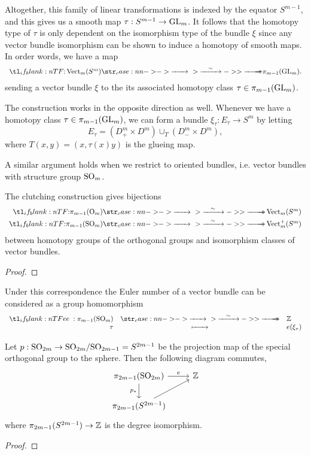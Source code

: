 Altogether, this family of linear transformations is indexed by the equator $S^{m-1}$, and this gives us a smooth map $\tau : S^{m-1}\to \mathrm{GL}_m$. It follows that the homotopy type of $\tau$ is only dependent on the isomorphism type of the bundle $\xi$ since any vector bundle isomorphism can be shown to induce a homotopy of smooth maps. In order words, we have a map
\[
	\lkxfunc{}{\Vect_m(S^m)}{\pi_{m-1}(\GL_m).}
\]
sending a vector bundle $\xi$ to the its associated homotopy class $\tau\in \pi_{m-1}(\mathrm{GL}_m)$.

The construction works in the opposite direction as well. Whenever we have a homotopy class $\tau\in \pi_{m-1}(\mathrm{GL}_m)$, we can form a bundle $\xi_\tau : E_\tau \to S^{m}$ by letting
\[
	E_\tau = (D_+^m\times D^m)\cup_T (D_-^{m}\times D^m),
\]
where $T(x,y)=(x,\tau(x)y)$ is the glueing map.


A similar argument holds when we restrict to oriented bundles, i.e. vector bundles with structure group $\mathrm{SO}_m$.

\begin{theorem}
	The clutching construction gives bijections
	\[
		\begin{aligned}
			\lkxfunc{}{\pi_{m-1}(\O_m)}{\Vect_m(S^m)} \\
			\lkxfunc{}{\pi_{m-1}(\SO_m)}{\Vect_m^+(S^m)}
		\end{aligned}
	\]
	between homotopy groups of the orthogonal groups and isomorphism classes of vector bundles.
\end{theorem}
\begin{proof}
\end{proof}

Under this correspondence the Euler number of a vector bundle can be considered as a group homomorphism
\[
	\lkxfunc{e}{\pi_{m-1}(\SO_m)}{\Z}{\tau}{e(\xi_\tau)}
\]
\begin{theorem}\label{thm:euler-number-of-vector-bundle-over-sphere}
	Let $p : \mathrm{SO}_{2m} \to \mathrm{SO}_{2m}/\mathrm{SO}_{2m-1}= S^{2m-1}$ be the projection map of the special orthogonal group to the sphere. Then the following diagram commutes,
	\[\begin{tikzcd}
			{\pi_{2m-1}(\SO_{2m})} & \Z \\
			{\pi_{2m-1}(S^{2m-1})}
			\arrow["e", from=1-1, to=1-2]
			\arrow["{p_*}"', from=1-1, to=2-1]
			\arrow[from=2-1, to=1-2]
		\end{tikzcd}\]
	where $\pi_{2m-1}(S^{2m-1})\to \mathbb{Z}$ is the degree isomorphism.
\end{theorem}
\begin{proof}
\end{proof}


